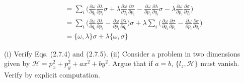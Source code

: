 \documentclass[../principles-of-quantum-mechanics.tex]{subfiles}
\begin{document}
\begin{questions}
\begin{solution}
\begin{align*}
				&= \sum_i\Big(\frac{\partial\omega}{\partial q_i}\frac{\partial\lambda}{\partial p_i}\sigma + \lambda\frac{\partial\omega}{\partial q_i}\frac{\partial\sigma}{\partial p_i} - \frac{\partial\omega}{\partial p_i}\frac{\partial\lambda}{\partial q_i}\sigma - \lambda\frac{\partial\omega}{\partial p_i}\frac{\partial\sigma}{\partial q_i}\Big) \\
				&= \sum_i\Big(\frac{\partial\omega}{\partial q_i}\frac{\partial\lambda}{\partial p_i} - \frac{\partial\omega}{\partial p_i}\frac{\partial\lambda}{\partial q_i}\Big)\sigma + \lambda\sum_i\Big(\frac{\partial\omega}{\partial q_i}\frac{\partial\sigma}{\partial p_i} - \frac{\partial\omega}{\partial p_i}\frac{\partial\sigma}{\partial q_i}\Big) \\
				&= \{\omega, \lambda\}\sigma + \lambda\{\omega, \sigma\}
			\end{align*}
		\end{solution}
	
		\question (i) Verify Eqs. (2.7.4) and (2.7.5). (ii) Consider a problem in two dimensions given by $\mathcal{H} = p_x^2 + p_y^2 + ax^2 + by^2$. Argue that if $a=b$, $\{l_z, \mathcal{H}\}$ must vanish. Verify by explicit computation.
		

\end{questions}
\end{document}
